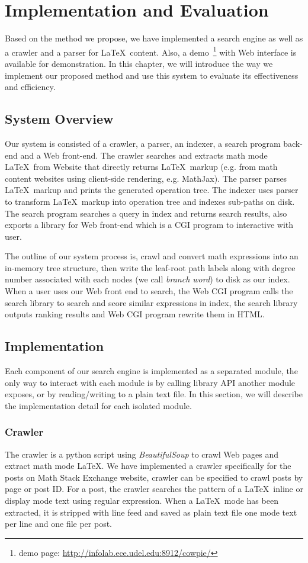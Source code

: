 \chapter{Implementation and Evaluation}
Based on the method we propose, we have implemented a search engine as well as a crawler and a parser for \LaTeX\ content. Also, a demo~\footnote{demo page: \url{http://infolab.ece.udel.edu:8912/cowpie/}} with Web interface is available for demonstration. 
In this chapter, we will introduce the way we implement our proposed method and use this system to evaluate its effectiveness and efficiency.

\section{System Overview}
Our system is consisted of a crawler, a parser, an indexer, a search program back-end and a Web front-end. 
The crawler searches and extracts math mode \LaTeX\ from Website that directly returns \LaTeX\ markup (e.g. from math content websites using client-side rendering, e.g. MathJax). The parser parses \LaTeX\ markup and prints the generated operation tree.
The indexer uses parser to transform \LaTeX\ markup into operation tree and indexes sub-paths on disk. 
The search program searches a query in index and returns search results, also exports a library for Web front-end which is a CGI program to interactive with user. 

The outline of our system process is, crawl and convert math expressions into an in-memory tree structure, then write the leaf-root path labels along with degree number associated with each nodes (we call \textit{branch word}) to disk as our index. 
When a user uses our Web front end to search, the Web CGI program calls the search library to search and score similar expressions in index, the search library outputs ranking results and Web CGI program rewrite them in HTML.

\section{Implementation}
Each component of our search engine is implemented as a separated module, the only way to interact with each module is by calling library API another module exposes, or by reading/writing to a plain text file. 
In this section, we will describe the implementation detail for each isolated module.

\subsection{Crawler}
The crawler is a python script using \textit{BeautifulSoup} to crawl Web pages and extract math mode \LaTeX. 
We have implemented a crawler specifically for the posts on Math Stack Exchange website, crawler can be specified to crawl posts by page or post ID.
For a post, the crawler searches the pattern of a \LaTeX\ inline or display mode text using regular expression. 
When a \LaTeX\ mode has been extracted, it is stripped with line feed and saved as plain text file one mode text per line and one file per post.

